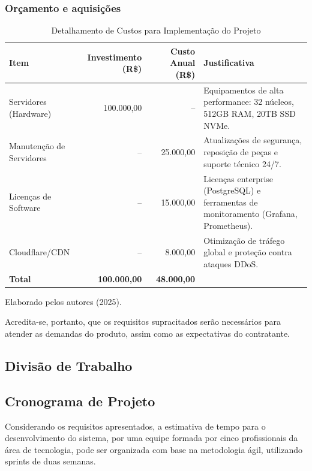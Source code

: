 \documentclass[a4paper, 12pt]{article}
\begin{document}
\subsubsection{Orçamento e aquisições}
\begin{table}[h]
\centering
\caption{Detalhamento de Custos para Implementação do Projeto}
\label{tab:custos}
\begin{tabular}{@{} >{\raggedright}p{2.5cm} r r p{3.5cm} @{}}
\toprule
\textbf{Item} & \textbf{Investimento (R\$)} & \textbf{Custo Anual (R\$)} & \textbf{Justificativa} \\
\midrule
Servidores (Hardware) & 100.000,00 & -- & Equipamentos de alta performance: 32 núcleos, 512GB RAM, 20TB SSD NVMe. \\
\addlinespace
Manutenção de Servidores & -- & 25.000,00 & Atualizações de segurança, reposição de peças e suporte técnico 24/7. \\
\addlinespace
Licenças de Software & -- & 15.000,00 & Licenças enterprise (PostgreSQL) e ferramentas de monitoramento (Grafana, Prometheus). \\
\addlinespace
Cloudflare/CDN & -- & 8.000,00 & Otimização de tráfego global e proteção contra ataques DDoS. \\
\bottomrule
\textbf{Total} & \textbf{100.000,00} & \textbf{48.000,00} & \\
\bottomrule
\end{tabular}
\smallskip
\centering\footnotesize Elaborado pelos autores (2025).
\end{table}

Acredita-se, portanto, que os requisitos supracitados serão necessários para atender as demandas do produto, assim como as expectativas do contratante.

\newpage

\subsection{Divisão de Trabalho}


\subsection{Cronograma de Projeto}

Considerando os requisitos apresentados, a estimativa de tempo para o desenvolvimento do sistema, por uma equipe formada por cinco profissionais da área de tecnologia, pode ser organizada com base na metodologia ágil, utilizando sprints de duas semanas.
\end{document}
